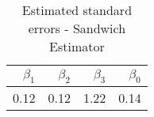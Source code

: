 \begin{table}[ht]
\centering
\begin{tabular}{rrrr}
  \hline
$\beta_1$ & $\beta_2$ & $\beta_3$ & $\beta_0$ \\ 
  \hline
0.12 & 0.12 & 1.22 & 0.14 \\ 
   \hline
\end{tabular}
\caption{Estimated standard errors - Sandwich Estimator} 
\label{tab:sandwich}
\end{table}
